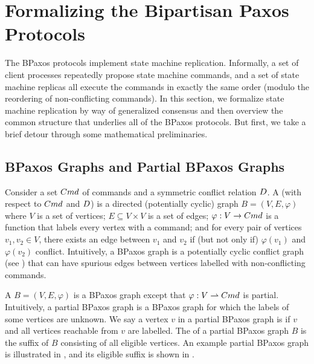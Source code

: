 \section{Formalizing the Bipartisan Paxos Protocols}
The BPaxos protocols implement state machine replication. Informally, a set of
client processes repeatedly propose state machine commands, and a set of state
machine replicas all execute the commands in exactly the same order (modulo the
reordering of non-conflicting commands). In this section, we formalize state
machine replication by way of generalized consensus and then overview the
common structure that underlies all of the BPaxos protocols. But first, we take
a brief detour through some mathematical preliminaries.

\subsection{BPaxos Graphs and Partial BPaxos Graphs}
Consider a set $Cmd$ of commands and a symmetric conflict relation
$D$. A  (with respect to $Cmd$ and $D$)
is a directed (potentially cyclic) graph $B = (V, E, \varphi)$ where
%
  $V$ is a set of vertices;
%
  $E \subseteq V \times V$ is a set of edges;
%
  $\varphi: V \to Cmd$ is a function that labels every vertex with a command;
  and
%
  for every pair of vertices $v_1, v_2 \in V$, there exists an edge between
  $v_1$ and $v_2$ if (but not only if) $\varphi(v_1)$ and $\varphi(v_2)$
  conflict.
%
Intuitively, a BPaxos graph is a potentially cyclic conflict graph (see
) that can have spurious edges between vertices labelled
with non-conflicting commands.

A  $B = (V, E, \varphi)$ is a BPaxos graph except
that $\varphi: V \rightharpoonup Cmd$ is partial. Intuitively, a partial BPaxos
graph is a BPaxos graph for which the labels of some vertices are unknown.
%
We say a vertex $v$ in a partial BPaxos graph is  if $v$ and
all vertices reachable from $v$ are labelled. The  of
a partial BPaxos graph $B$ is the suffix of $B$ consisting of all eligible
vertices.
%
An example partial BPaxos graph is illustrated in ,
and its eligible suffix is shown in .



